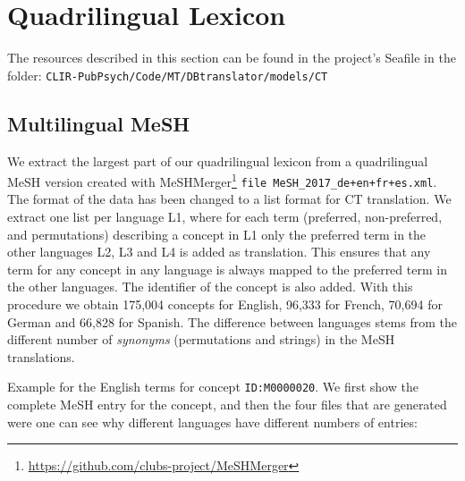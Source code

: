 \documentclass[a4paper,11pt]{article}
\begin{document}
	
	\section{Quadrilingual Lexicon}
	\label{s:lexicon}
	
	The resources described in this section can be found in the project's Seafile in the folder:
	{\tt CLIR-PubPsych/Code/MT/DBtranslator/models/CT} 
	
	
	\subsection{Multilingual MeSH}
	\label{ss:meshLex}
	
	We extract the largest part of our quadrilingual lexicon from a quadrilingual MeSH version created with MeSHMerger\footnote{\url{https://github.com/clubs-project/MeSHMerger}} {\tt file MeSH\_2017\_de+en+fr+es.xml}. The format of the data has been changed to a list format for CT translation. We extract one list per language L1, where for each term (preferred, non-preferred, and permutations) describing a concept in L1 only the preferred term in the other languages L2, L3 and L4 is added as translation. This ensures that any term for any concept in any language is always mapped to the preferred term in the other languages. The identifier of the concept is also added. With this procedure we obtain 175,004 concepts for English, 96,333 for French, 70,694 for German and 66,828 for Spanish. The difference between languages stems from the different number of \emph{synonyms} (permutations and strings) in the MeSH translations.
	
	\bigskip
	\noindent Example for the English terms for concept {\tt ID:M0000020}. We first show the complete MeSH entry for the concept, and then the four files that are generated were one can see why different languages have different numbers of entries:
	
\end{document}
